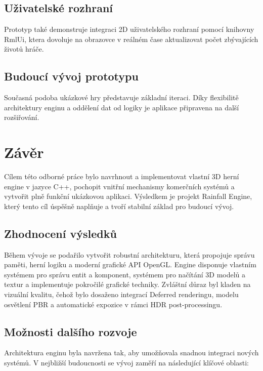 \documentclass[12pt,a4paper]{article}
\begin{document}
\subsection{Uživatelské rozhraní}
Prototyp také demonstruje integraci 2D uživatelského rozhraní pomocí knihovny RmlUi, ktera dovoluje na obrazovce v reálném čase aktualizovat počet zbývajících životů hráče.

\subsection{Budoucí vývoj prototypu}
Současná podoba ukázkové hry představuje základní iteraci. Díky flexibilitě architektury enginu a oddělení dat od logiky je aplikace připravena na další rozšiřování.




\section{Závěr}
Cílem této odborné práce bylo navrhnout a implementovat vlastní 3D herní engine v jazyce C++, pochopit vnitřní mechanismy komerčních systémů a vytvořit plně funkční ukázkovou aplikaci. Výsledkem je projekt Rainfall Engine, který tento cíl úspěšně naplňuje a tvoří stabilní základ pro budoucí vývoj.

\subsection{Zhodnocení výsledků}
Během vývoje se podařilo vytvořit robustní architekturu, která propojuje správu paměti, herní logiku a moderní grafické API OpenGL. Engine disponuje vlastním systémem pro správu entit a komponent, systémem pro načítání 3D modelů a textur a implementuje pokročilé grafické techniky. Zvláštní důraz byl kladen na vizuální kvalitu, čehož bylo dosaženo integrací Deferred renderingu, modelu osvětlení PBR a automatické expozice v rámci HDR post-processingu.

\subsection{Možnosti dalšího rozvoje}
Architektura enginu byla navržena tak, aby umožňovala snadnou integraci nových systémů. V nejbližší budoucnosti se vývoj zaměří na následující klíčové oblasti:
\end{document}
